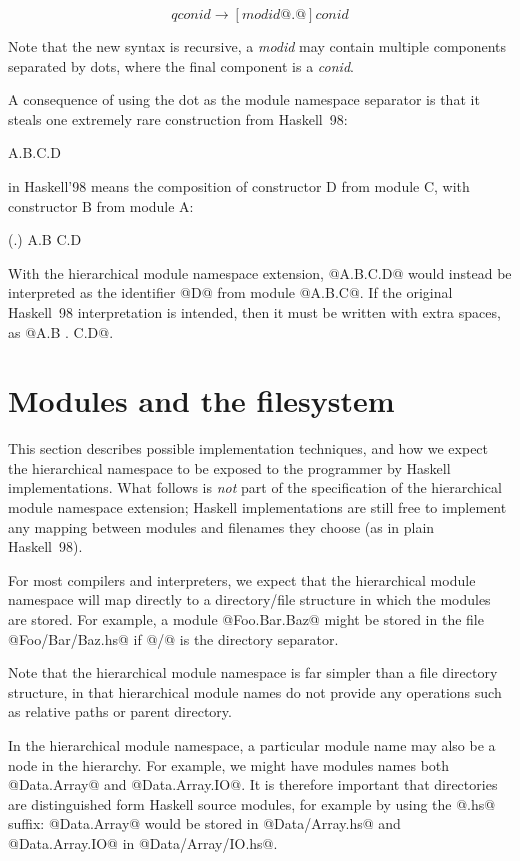 \documentclass[a4paper,twoside]{article}
\begin{document}
\[
   \textit{qconid} \rightarrow [ \textit{modid} @.@ ] \textit{conid}
\]

\noindent Note that the new syntax is recursive, a \textit{modid} may contain
multiple components separated by dots, where the final component is a
\textit{conid}.

A consequence of using the dot as the module namespace separator is
that it steals one extremely rare construction from Haskell~98:

\begin{code}
   A.B.C.D 
\end{code}

\noindent in Haskell'98 means the composition of constructor D from
module C, with constructor B from module A:

\begin{code}
   (.)  A.B  C.D 
\end{code}

\noindent With the hierarchical module namespace extension, @A.B.C.D@
would instead be interpreted as the identifier @D@ from module
@A.B.C@.  If the original Haskell~98 interpretation is intended, then
it must be written with extra spaces, as @A.B . C.D@.

\section{Modules and the filesystem}
      
This section describes possible implementation techniques, and how we
expect the hierarchical namespace to be exposed to the programmer by
Haskell implementations.  What follows is \emph{not} part of the
specification of the hierarchical module namespace extension; Haskell
implementations are still free to implement any mapping between
modules and filenames they choose (as in plain Haskell~98).

For most compilers and interpreters, we expect that the hierarchical
module namespace will map directly to a directory/file structure in
which the modules are stored.  For example, a module @Foo.Bar.Baz@
might be stored in the file @Foo/Bar/Baz.hs@ if @/@ is the directory
separator.

Note that the hierarchical module namespace is far simpler than a file
directory structure, in that hierarchical module names do not provide
any operations such as relative paths or parent directory.

In the hierarchical module namespace, a particular module name may
also be a node in the hierarchy.  For example, we might have modules
names both @Data.Array@ and @Data.Array.IO@.  It is therefore
important that directories are distinguished form Haskell source
modules, for example by using the @.hs@ suffix: @Data.Array@ would be
stored in @Data/Array.hs@ and @Data.Array.IO@ in @Data/Array/IO.hs@.
\end{document}

